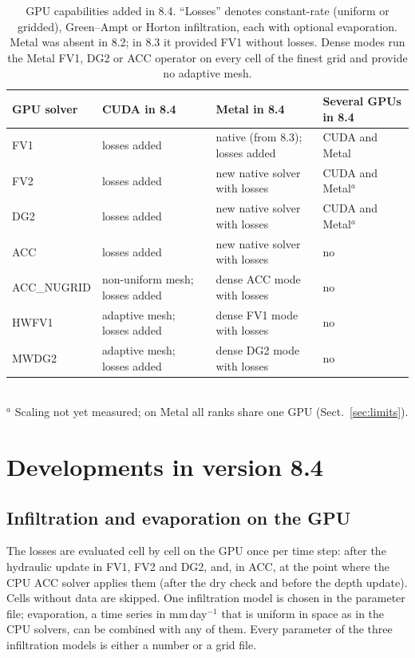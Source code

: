 \documentclass[gmd, manuscript]{copernicus}
\begin{document}
\begin{table}[t]
\caption{GPU capabilities added in 8.4. ``Losses'' denotes constant-rate
(uniform or gridded), Green--Ampt or Horton infiltration, each with optional
evaporation. Metal was absent in 8.2; in 8.3 it provided FV1 without losses.
Dense modes run the Metal FV1, DG2 or ACC operator on every cell of the
finest grid and provide no adaptive mesh.}
\label{tab:support}
\centering\small
\begin{tabularx}{\textwidth}{@{}l>{\raggedright\arraybackslash}X>{\raggedright\arraybackslash}X>{\raggedright\arraybackslash}X@{}}
\toprule
GPU solver & CUDA in 8.4 & Metal in 8.4 & Several GPUs in 8.4 \\
\midrule
FV1 & losses added & native (from 8.3); losses added & CUDA and Metal \\
FV2 & losses added & new native solver with losses & CUDA and Metal$^{a}$ \\
DG2 & losses added & new native solver with losses & CUDA and Metal$^{a}$ \\
ACC & losses added & new native solver with losses & no \\
ACC\_NUGRID & non-uniform mesh; losses added & dense ACC mode with losses & no \\
HWFV1 & adaptive mesh; losses added & dense FV1 mode with losses & no \\
MWDG2 & adaptive mesh; losses added & dense DG2 mode with losses & no \\
\bottomrule
\end{tabularx}
\\[2pt]{\footnotesize $^{a}$ Scaling not yet measured; on Metal all ranks share one GPU (Sect.~\ref{sec:limits}).}
\end{table}

\section{Developments in version 8.4}\label{sec:developments}

\subsection{Infiltration and evaporation on the GPU}\label{sec:losses}

The losses are evaluated cell by cell on the GPU once per time step: after
the hydraulic update in FV1, FV2 and DG2, and, in ACC, at the point where the
CPU ACC solver applies them (after the dry check and before the depth
update). Cells without data are skipped. One infiltration model is chosen in
the parameter file; evaporation, a time series in mm\,day$^{-1}$ that is
uniform in space as in the CPU solvers, can be combined with any of them.
Every parameter of the three infiltration models is either a number or a grid
file.
\end{document}
